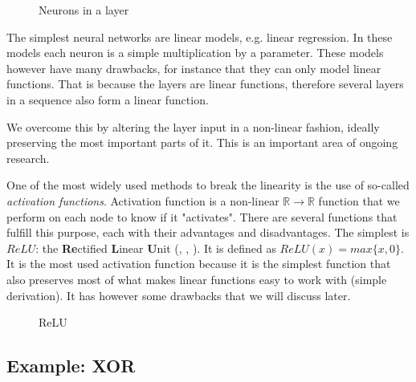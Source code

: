 \begin{figure}[h]
\center
\caption{Neurons in a layer}
\label{nndiagram1}
\medskip
{}
\end{figure}	

The simplest neural networks are linear models, e.g. linear regression. In these models each neuron is a simple multiplication by a parameter. These models   however have many drawbacks, for instance that they can only model linear functions. That is because the layers are linear functions, therefore several layers in a sequence also form a linear function.

We overcome this by altering the layer input in a non-linear fashion, ideally preserving the most important parts of it. This is an important area of ongoing research.

One of the most widely used methods to break the linearity is the use of so-called \textit{activation functions}. Activation function is a non-linear $\mathbb{R}\rightarrow \mathbb{R}$ function that we perform on each node to know if it "activates". There are several functions that fulfill this purpose, each with their advantages and disadvantages. The simplest is $ReLU$: the \textbf{Re}ctified \textbf{L}inear \textbf{U}nit (\cite{relu1}, \cite{relu2}, \cite{relu3}). It is defined as $ReLU(x)=max\{x,0\}$. It is the most used activation function because it is the simplest function that also preserves most of what makes linear functions easy to work with (simple derivation). It has however some drawbacks that we will discuss later.

\begin{figure}[h]
\caption{ReLU}
\center
{}
\end{figure}

\subsection{Example: XOR}


